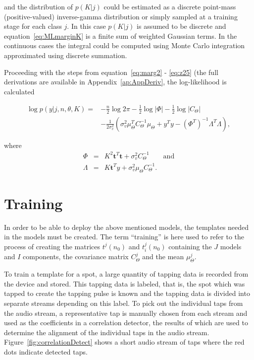 and the distribution of $p(K|j)$ could be estimated as a discrete point-mass \linebreak[0](positive-valued) inverse-gamma distribution or simply sampled at a training stage for each class $j$. In this case $p(K|j)$ is assumed to be discrete and equation~\ref{eq:MLmarginK} is a finite sum of weighted Gaussian terms. In the continuous cases the integral could be computed using Monte Carlo integration approximated using discrete summation.

Proceeding with the steps from equation~\ref{eq:marg2} - \ref{eq:z25} (the full derivations are available in Appendix~\ref{ap:AppDeriv}, the log-likelihood is calculated

\begin{equation}\label{eq:loglikeliK}\begin{split}
\log{p(y|j,n,\theta,K)} = &- \frac{n}{2}\log{2 \pi}- \frac{1}{2}\log{|\Phi|} - \frac{1}{2}\log{|C_\Theta|} \\
& -\frac{1}{2\sigma^2_v}\left(\sigma_v^2\mu_\Theta^TC_\Theta^{-1}\mu_\Theta + y^Ty- \left(\Phi^T\right)^{-1}\Lambda^T\Lambda\right),
\end{split}\end{equation}

where
\begin{eqnarray}
\label{eq:z3K}
\Phi &=& K^2 \textbf{t}^T\textbf{t} + \sigma_v^2C_\Theta^{-1} \qquad \textrm{and}\\\nonumber
\Lambda &=& K \textbf{t}^Ty + \sigma_v^2\mu_\Theta C_\Theta^{-1}.
\end{eqnarray}

\section{Training}\label{sec:APRtraining}
In order to be able to deploy the above mentioned models, the templates needed in the models must be created. The term ``training'' is here used to refer to the process of creating the matrices $t^j(n_0)$ and $t^j_i(n_0)$ containing the $J$ models and $I$ components, the covariance matrix $C^j_\Theta$ and the mean $\mu^j_\Theta$.

To train a template for a spot, a large quantity of tapping data is recorded from the device and stored. This tapping data is labeled, that is, the spot which was tapped to create the tapping pulse is known and the tapping data is divided into separate streams depending on this label. To pick out the individual taps from the audio stream, a representative tap is manually chosen from each stream and used as the coefficients in a correlation detector, the results of which are used to determine the alignment of the individual taps in the audio stream. Figure~\ref{fig:correlationDetect} shows a short audio stream of taps where the red dots indicate detected taps.

